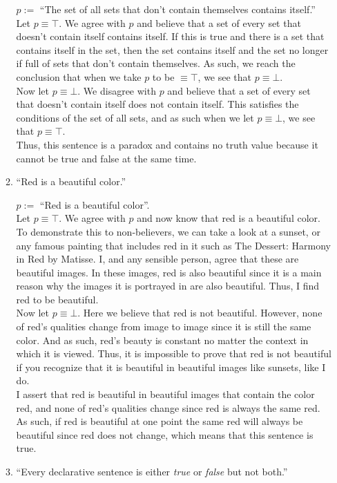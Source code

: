 \documentclass[11pt,a4paper]{article}
\begin{document}
\begin{enumerate}
\begin{enumerate}
        $p := $ ``The set of all sets that don't contain themselves contains itself.'' \\ Let $p \equiv \top$. We agree with $p$ and believe that a set of every set that doesn't contain itself contains itself. If this is true and there is a set that contains itself in the set, then the set contains itself and the set no longer if full of sets that don't contain themselves. As such, we reach the conclusion that when we take $p$ to be $\equiv \top$, we see that $p \equiv \bot$. \\ Now let $p \equiv \bot$. We disagree with $p$ and believe that a set of every set that doesn't contain itself does not contain itself. This satisfies the conditions of the set of all sets, and as such when we let $p \equiv \bot$, we see that $p \equiv \top$. \\ Thus, this sentence is a paradox and contains no truth value because it cannot be true and false at the same time.
      \item
        ``Red is a beautiful color.''

        $p := $ ``Red is a beautiful color''. \\ Let $p \equiv \top$. We agree with $p$ and now know that red is a beautiful color. To demonstrate this to non-believers, we can take a look at a sunset, or any famous painting that includes red in it such as The Dessert: Harmony in Red by Matisse. I, and any sensible person, agree that these are beautiful images. In these images, red is also beautiful since it is a main reason why the images it is portrayed in are also beautiful. Thus, I find red to be beautiful. \\ Now let $p \equiv \bot$. Here we believe that red is not beautiful. However, none of red's qualities change from image to image since it is still the same color. And as such, red's beauty is constant no matter the context in which it is viewed. Thus, it is impossible to prove that red is not beautiful if you recognize that it is beautiful in beautiful images like sunsets, like I do. \\ I assert that red is beautiful in beautiful images that contain the color red, and none of red's qualities change since red is always the same red. As such, if red is beautiful at one point the same red will always be beautiful since red does not change, which means that this sentence is true. 
      \item
        ``Every declarative sentence is either \emph{true} or \emph{false} but not both.''


\end{enumerate}
\end{enumerate}
\end{document}
